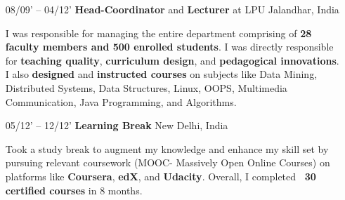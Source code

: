 \documentclass{article}
\begin{document}
\begin{itemize}[leftmargin=-1ex]
   \item[08/09' – 04/12'] \textbf{Head-Coordinator} and \textbf{Lecturer} at LPU \hfill Jalandhar, India
   
   \item[] I was responsible for managing the entire department comprising of \textbf{28 faculty members and 500 enrolled students}. I was directly responsible for \textbf{teaching quality}, \textbf{curriculum design}, and \textbf{pedagogical innovations}. I also \textbf{designed} and \textbf{instructed courses} on subjects like Data Mining, Distributed Systems, Data Structures, Linux, OOPS, Multimedia Communication, Java Programming, and Algorithms.

\end{itemize}

\begin{itemize}[leftmargin=-1ex] \setlength\itemsep{0.25em}
    \item[05/12' – 12/12'] \textbf{Learning Break} \hfill New Delhi, India
   \item[] Took a study break to augment my knowledge and enhance my skill set by pursuing relevant coursework (MOOC- Massively Open Online Courses) on platforms like \textbf{Coursera}, \textbf{edX}, and \textbf{Udacity}. Overall, I completed \textbf{~30 certified courses} in 8 months.
\end{itemize}
\end{document}
